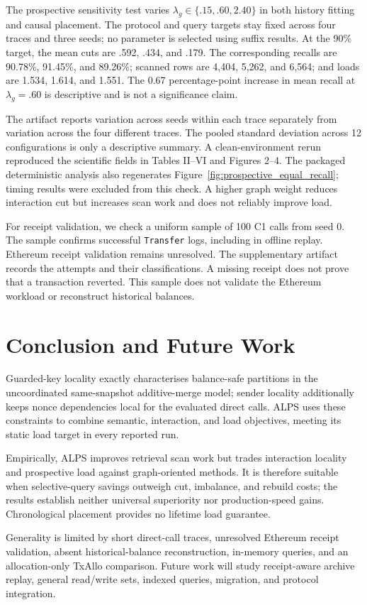 \documentclass[conference,letterpaper]{IEEEtran}
\begin{document}
The prospective sensitivity test varies
$\lambda_g\in\{.15,.60,2.40\}$ in both history fitting and causal placement.
The protocol and query targets stay fixed across four traces and three seeds;
no parameter is selected using suffix results. At the 90\% target, the mean
cuts are .592, .434, and .179. The corresponding recalls are 90.78\%,
91.45\%, and 89.26\%; scanned rows are 4,404, 5,262, and 6,564; and loads
are 1.534, 1.614, and 1.551. The 0.67 percentage-point increase in mean
recall at $\lambda_g=.60$ is descriptive and is not a significance claim.

The artifact reports variation across seeds within each trace separately from
variation across the four different traces. The pooled standard deviation
across 12 configurations is only a descriptive summary. A clean-environment
rerun reproduced the scientific fields in Tables II--VI and Figures 2--4.
The packaged deterministic analysis also regenerates
Figure~\ref{fig:prospective_equal_recall}; timing results were excluded from
this check. A higher graph weight reduces interaction cut but increases scan
work and does not reliably improve load.

For receipt validation, we check a uniform sample of 100 C1 calls from seed
0. The sample confirms successful \texttt{Transfer} logs, including in offline
replay. Ethereum receipt validation remains unresolved. The supplementary
artifact records the attempts and their classifications. A missing receipt
does not prove that a transaction reverted. This sample does not validate the
Ethereum workload or reconstruct historical balances.

\FloatBarrier

\section{Conclusion and Future Work}
Guarded-key locality exactly characterises balance-safe partitions in the
uncoordinated same-snapshot additive-merge model; sender locality additionally
keeps nonce dependencies local for the evaluated direct calls. ALPS uses these
constraints to combine semantic, interaction, and load objectives, meeting its
static load target in every reported run.

Empirically, ALPS improves retrieval scan work but trades interaction locality
and prospective load against graph-oriented methods. It is therefore suitable
when selective-query savings outweigh cut, imbalance, and rebuild costs; the
results establish neither universal superiority nor production-speed gains.
Chronological placement provides no lifetime load guarantee.

Generality is limited by short direct-call traces, unresolved Ethereum receipt
validation, absent historical-balance reconstruction, in-memory queries, and an
allocation-only TxAllo comparison. Future work will study receipt-aware archive
replay, general read/write sets, indexed queries, migration, and protocol
integration.



\end{document}
